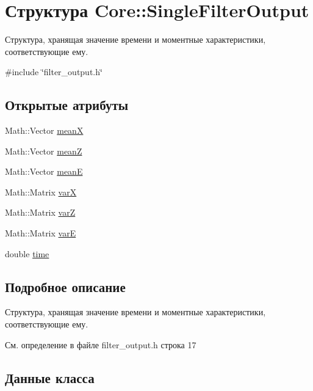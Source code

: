 \hypertarget{struct_core_1_1_single_filter_output}{}\section{Структура Core\+:\+:Single\+Filter\+Output}
\label{struct_core_1_1_single_filter_output}


Структура, хранящая значение времени и моментные характеристики, соответствующие ему.  




{\ttfamily \#include \char`\"{}filter\+\_\+output.\+h\char`\"{}}

\subsection*{Открытые атрибуты}
\begin{DoxyCompactItemize}
\item 
Math\+::\+Vector \hyperlink{struct_core_1_1_single_filter_output_aa06ff31e25433b19e09b67b290a187ca}{meanX}
\item 
Math\+::\+Vector \hyperlink{struct_core_1_1_single_filter_output_aa2350a5b96ca5ef7cdb056e091702b5d}{meanZ}
\item 
Math\+::\+Vector \hyperlink{struct_core_1_1_single_filter_output_ab8e09d89fe2c1bb1577242e950998c10}{meanE}
\item 
Math\+::\+Matrix \hyperlink{struct_core_1_1_single_filter_output_a31a2094b47d89df8ffd1befdf43d1f6e}{varX}
\item 
Math\+::\+Matrix \hyperlink{struct_core_1_1_single_filter_output_aa0b4c0793c1277fe75e19fd96dc4cde4}{varZ}
\item 
Math\+::\+Matrix \hyperlink{struct_core_1_1_single_filter_output_ab89885f694006365cd0f8e4a1bbc6187}{varE}
\item 
double \hyperlink{struct_core_1_1_single_filter_output_a4d2078c50b021df0d91e862d55619637}{time}
\end{DoxyCompactItemize}


\subsection{Подробное описание}
Структура, хранящая значение времени и моментные характеристики, соответствующие ему. 

См. определение в файле filter\+\_\+output.\+h строка 17



\subsection{Данные класса}
\hypertarget{struct_core_1_1_single_filter_output_ab8e09d89fe2c1bb1577242e950998c10}{}\label{struct_core_1_1_single_filter_output_ab8e09d89fe2c1bb1577242e950998c10} 
